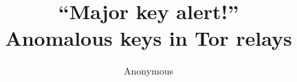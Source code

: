 \documentclass{llncs}
\begin{document}
\title{``Major key alert!''\\Anomalous keys in Tor relays}

\author{
	Anonymous
}


\maketitle

















% 


{}


\end{document}
